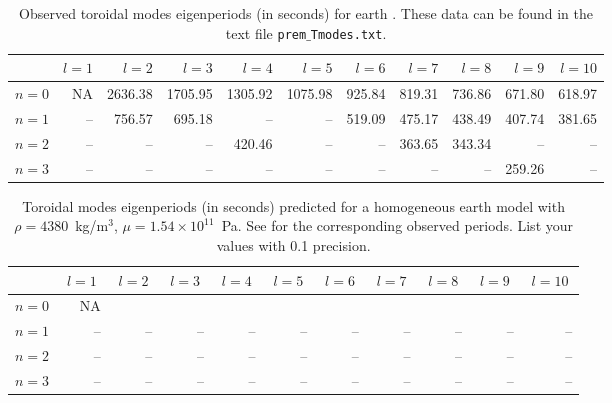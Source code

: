 \documentclass[11pt,titlepage,fleqn]{article}
\begin{document}
\begin{table}
\centering
\caption[]
{{
Observed toroidal modes eigenperiods (in seconds) for earth \citep{PREM}. These data can be found in the text file {\tt prem$\_$Tmodes.txt}.
\label{tab:modes}
}}
\begin{tabular}{||r|r|r|r|r|r|r|r|r|r|r||}
\hline
      & $l=1$ & $l=2$ & $l=3$ & $l=4$ & $l=5$ & $l=6$ & $l=7$ & $l=8$ & $l=9$ & $l=10$ \\ \hline\hline
$n=0$ & NA & 2636.38 & 1705.95 & 1305.92 & 1075.98 & 925.84 & 819.31 & 736.86 & 671.80 & 618.97 \\ \hline
$n=1$ & -- & 756.57 & 695.18 & -- & -- & 519.09 & 475.17 & 438.49 & 407.74 & 381.65 \\ \hline
$n=2$ & -- & -- & -- & 420.46 & -- & -- & 363.65 & 343.34 & -- & -- \\ \hline
$n=3$ & -- & -- & -- & -- & -- & -- & -- & -- & 259.26 & -- \\ \hline
\hline
\end{tabular}
\label{tab:mode_obs}
\end{table}


\begin{table}
\centering
\caption[]
{{
Toroidal modes eigenperiods (in seconds) predicted for a homogeneous earth model with $\rho = 4380$~kg/m$^3$, $\mu = 1.54 \times 10^{11}$~Pa.
See  for the corresponding observed periods.
List your values with 0.1 precision.
\label{tab:mode_pred}
}}
\begin{tabular}{||r|r|r|r|r|r|r|r|r|r|r||}
\hline
      & $\;l=1\;$ & $\;l=2\;$ & $\;l=3\;$ & $\;l=4\;$ & $\;l=5\;$ & $\;l=6\;$ & $\;l=7\;$ & $\;l=8\;$ & $\;l=9\;$ & $\;l=10\;$ \\ \hline\hline
$n=0$ & NA &  &  &  &  &  &  &  &  &  \\  \hline
$n=1$ & -- & -- & -- & -- & -- & -- & -- & -- & -- & -- \\  \hline
$n=2$ & -- & -- & -- & -- & -- & -- & -- & -- & -- & -- \\  \hline
$n=3$ & -- & -- & -- & -- & -- & -- & -- & -- & -- & -- \\  \hline
\hline
\end{tabular}
\end{table}
\end{document}

